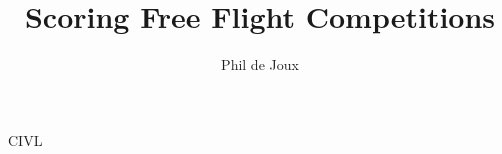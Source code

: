 \documentclass{beamer}
\title[Flare Timing]{Scoring Free Flight Competitions}
\author{Phil de Joux}
\institute{Block Scope}
\date{}
\begin{document}
\begin{frame}
\titlepage
\end{frame}

\begin{frame}
    CIVL
\end{frame}
\end{document}
